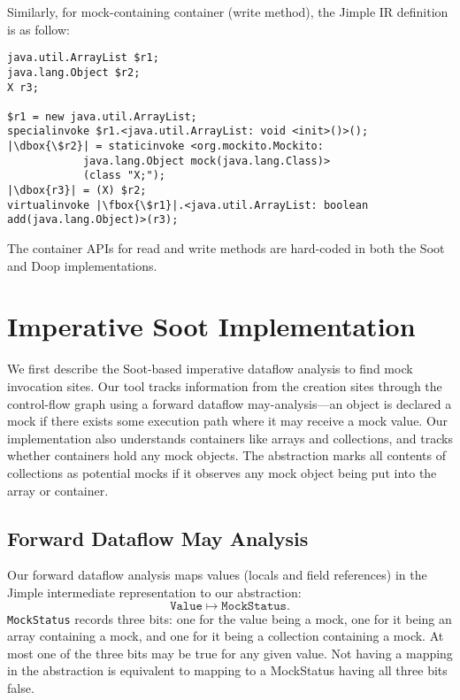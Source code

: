 Similarly, for mock-containing container (write method), the Jimple IR definition is as follow:

\begin{lstlisting}[basicstyle=\linespread{1.0}\ttfamily\small,numbers=none,escapechar={|}]
java.util.ArrayList $r1;
java.lang.Object $r2;
X r3;

$r1 = new java.util.ArrayList;
specialinvoke $r1.<java.util.ArrayList: void <init>()>();
|\dbox{\$r2}| = staticinvoke <org.mockito.Mockito: 
			java.lang.Object mock(java.lang.Class)>
			(class "X;");
|\dbox{r3}| = (X) $r2;
virtualinvoke |\fbox{\$r1}|.<java.util.ArrayList: boolean add(java.lang.Object)>(r3);
\end{lstlisting}

The container APIs for read and write methods are hard-coded in both the Soot and Doop implementations.

\section{Imperative Soot Implementation}
\label{sec:soot}
We first describe the Soot-based imperative dataflow analysis to find mock invocation sites. Our tool tracks information from the creation sites through the control-flow graph using a forward dataflow may-analysis---an object is declared a mock if there exists some execution path where it may receive a mock value. Our implementation also understands containers like arrays and collections, and tracks whether containers hold any mock objects. The abstraction marks all contents of collections as potential mocks if it observes any mock object being put into the array or container.


\subsection{Forward Dataflow May Analysis}

Our forward dataflow analysis maps values (locals and field references) in the Jimple intermediate representation to our abstraction:
\[ \mathtt{Value} \mapsto \mathtt{MockStatus}. \]
\texttt{MockStatus} records three bits: one for the value being a mock, one for it being an array containing a mock, and one for it being a collection containing a mock. At most one of the three bits may be true for any given value. Not having a mapping in the abstraction is equivalent to mapping to a MockStatus having all three bits false. 

